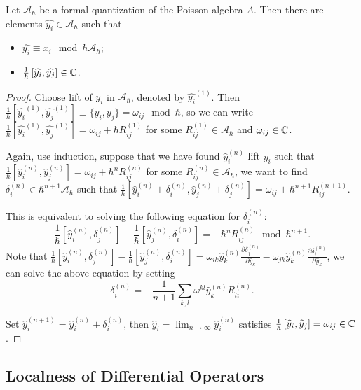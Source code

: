 \documentclass[12pt]{amsart}
\numberwithin{equation}{section}
\newcommand{\CA}{{\mathcal {A}}} \newcommand{\CB}{{\mathcal {B}}} \newcommand{\CC}{{\mathcal {C}}}
\renewcommand{\hat}{\widehat}
\begin{document}
\begin{thm}
  Let $\CA_{\hbar}$ be a formal quantization of the Poisson algebra $A$. Then there are elements $\hat{y_i} \in \CA_{\hbar}$ such that
  \begin{itemize}
    \item $\hat{y_i} \equiv x_i \mod \hbar \CA_{\hbar}$;
    \item $\frac{1}{\hbar}\left[\hat{y_i}, \hat{y_j}\right] \in \BC$.
  \end{itemize}
\end{thm}

\begin{proof}
  Choose lift of $y_i$ in $\CA_{\hbar}$, denoted by $\hat{y_i}^{(1)}$. Then $\frac{1}{\hbar}\left[\hat{y_i}^{(1)}, \hat{y_j}^{(1)}\right] \equiv \{y_i, y_j\} = \omega_{ij} \mod \hbar$, so we can write $\frac{1}{\hbar}\left[\hat{y_i}^{(1)}, \hat{y_j}^{(1)}\right] = \omega_{ij} + \hbar R_{ij}^{(1)}$ for some $R_{ij}^{(1)} \in \CA_{\hbar}$ and $\omega_{ij} \in {\mathbb {C}}$.

  Again, use induction, suppose that we have found $\hat{y}_i^{(n)}$ lift $y_i$ such that $\frac{1}{\hbar}\left[\hat{y}_i^{(n)}, \hat{y}_j^{(n)}\right] = \omega_{ij} + \hbar^{n} R_{ij}^{(n)}$ for some $R_{ij}^{(n)} \in \CA_{\hbar}$, we want to find $\delta_i^{(n)} \in \hbar^{n+1} \CA_{\hbar}$ such that $\frac{1}{\hbar}\left[\hat{y}_i^{(n)} + \delta_i^{(n)}, \hat{y}_j^{(n)} + \delta_j^{(n)}\right] = \omega_{ij} + \hbar^{n+1} R_{ij}^{(n+1)}$.

  This is equivalent to solving the following equation for $\delta_i^{(n)}$:
  \[\frac{1}{\hbar}\left[\hat{y}_i^{(n)}, \delta_j^{(n)}\right] - \frac{1}{\hbar}\left[\hat{y}_j^{(n)}, \delta_i^{(n)}\right] = -\hbar^{n} R_{ij}^{(n)} \mod \hbar^{n+1}.\]
  Note that $\frac{1}{\hbar}\left[\hat{y}_i^{(n)}, \delta_j^{(n)}\right] - \frac{1}{\hbar}\left[\hat{y}_j^{(n)}, \delta_i^{(n)}\right] = \omega_{ik} \hat{y}_k^{(n)}\frac{\partial \delta_j^{(n)}}{\partial \hat{y}_k} - \omega_{jk} \hat{y}_k^{(n)}\frac{\partial \delta_i^{(n)}}{\partial \hat{y}_k}$, we can solve the above equation by setting
$$\delta_i^{(n)} = -\frac{1}{n+1} \sum_{k,l} \omega^{kl} \hat{y}_k^{(n)} R_{li}^{(n)}.$$
  
  Set $\hat{y}_i^{(n+1)} = \hat{y}_i^{(n)} + \delta_i^{(n)}$, then $\hat{y}_i = \lim_{n \to \infty} \hat{y}_i^{(n)}$ satisfies $\frac{1}{\hbar}\left[\hat{y}_i, \hat{y}_j\right] = \omega_{ij} \in \BC$.
\end{proof}


\subsection{Localness of Differential Operators}
\end{document}
